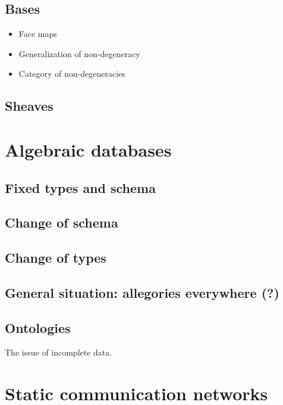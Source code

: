 \documentclass{amsart}
\begin{document}
\subsection{Bases}

\begin{itemize}

\item Face maps
\item Generalization of non-degeneracy
\item Category of non-degeneracies

\end{itemize}

\subsection{Sheaves}

\section{Algebraic databases}

\subsection{Fixed types and schema}

\subsection{Change of schema}

\subsection{Change of types}

\subsection{General situation: allegories everywhere (?)}

\subsection{Ontologies}

The issue of incomplete data.

\section{Static communication networks}
\end{document}
